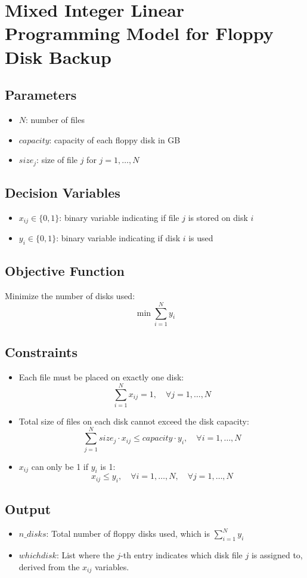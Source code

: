 \documentclass{article}
\begin{document}
\section*{Mixed Integer Linear Programming Model for Floppy Disk Backup}

\subsection*{Parameters}
\begin{itemize}
    \item $N$: number of files
    \item $capacity$: capacity of each floppy disk in GB
    \item $size_j$: size of file $j$ for $j = 1, \ldots, N$
\end{itemize}

\subsection*{Decision Variables}
\begin{itemize}
    \item $x_{ij} \in \{0,1\}$: binary variable indicating if file $j$ is stored on disk $i$
    \item $y_i \in \{0,1\}$: binary variable indicating if disk $i$ is used
\end{itemize}

\subsection*{Objective Function}
Minimize the number of disks used:
\[
\min \sum_{i=1}^{N} y_i
\]

\subsection*{Constraints}
\begin{itemize}
    \item Each file must be placed on exactly one disk:
    \[
    \sum_{i=1}^{N} x_{ij} = 1, \quad \forall j = 1, \ldots, N
    \]

    \item Total size of files on each disk cannot exceed the disk capacity:
    \[
    \sum_{j=1}^{N} size_j \cdot x_{ij} \leq capacity \cdot y_i, \quad \forall i = 1, \ldots, N
    \]

    \item $x_{ij}$ can only be 1 if $y_i$ is 1:
    \[
    x_{ij} \leq y_i, \quad \forall i = 1, \ldots, N, \quad \forall j = 1, \ldots, N
    \]
\end{itemize}

\subsection*{Output}
\begin{itemize}
    \item $n\_disks$: Total number of floppy disks used, which is $\sum_{i=1}^{N} y_i$
    \item $whichdisk$: List where the $j$-th entry indicates which disk file $j$ is assigned to, derived from the $x_{ij}$ variables.
\end{itemize}
\end{document}
